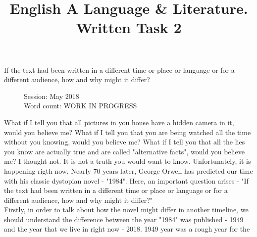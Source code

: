 \documentclass[a4paper,12pt]{article}
\title{English A Language \& Literature. Written Task 2}
\date{}
\author{}
\begin{document}
\maketitle
\begin{center}
  If the text had been written in a different time or place or language or for a different audience, how and why might it differ?
\end{center}
\begin{flushleft}
  \begin{figure}
    Session: May 2018\\
    Word count: WORK IN PROGRESS\\
    \end{figure}
\end{flushleft}
\newpage

What if I tell you that all pictures in you house have a hidden camera in it, would you believe me? What if I tell you that you are being watched all the time without you knowing, would you believe me?  What if I tell you that all the lies you know are actually true and are called "alternative facts", would you believe me? I thought not. It is not a truth you would want to know. Unfortunately, it is happening rigth now. Nearly 70 years later, George Orwell has predicted our time with his classic dystopian novel - "1984". Here, an important question arises - "If the text had been written in a different time or place or language or for a different audience, how and why might it differ?"\\

Firstly, in order to talk about how the novel might differ in another timeline, we should understand the difference between the year "1984" was published - 1949 and the year that we live in right now - 2018. 1949 year was a rough year for the 

\newpage


\end{document}
